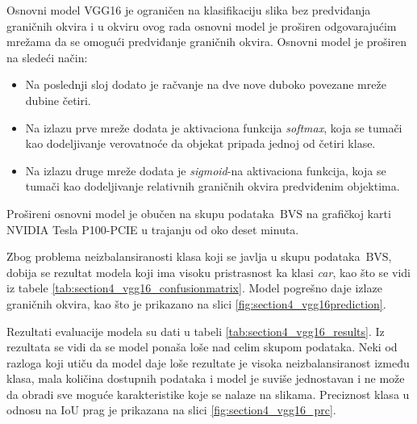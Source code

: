 \documentclass[12pt,oneside]{memoir}
\newcommand{\bvs}{\ensuremath{\,\textrm{BVS}}}
\begin{document}
Osnovni model VGG16 je ograničen na klasifikaciju slika bez predviđanja graničnih okvira i u okviru ovog rada osnovni model je proširen odgovarajućim mrežama da se omogući predviđanje graničnih okvira. Osnovni model je proširen na sledeći način:
\begin{itemize}
\item Na poslednji sloj dodato je račvanje na dve nove duboko povezane mreže dubine četiri.
\item Na izlazu prve mreže dodata je aktivaciona funkcija \textit{softmax}, koja se tumači kao dodeljivanje verovatnoće da objekat pripada jednoj od četiri klase.
\item Na izlazu druge mreže dodata je \textit{sigmoid}-na aktivaciona funkcija, koja se tumači kao dodeljivanje relativnih graničnih okvira predviđenim objektima.
\end{itemize}
Prošireni osnovni model je obučen na skupu podataka \bvs{} na grafičkoj karti NVIDIA Tesla P100-PCIE u trajanju od oko deset minuta.

Zbog problema neizbalansiranosti klasa koji se javlja u skupu podataka \bvs{}, dobija se rezultat modela koji ima visoku pristrasnost ka klasi \textit{car}, kao što se vidi iz tabele \ref{tab:section4_vgg16_confusionmatrix}. Model pogrešno daje izlaze graničnih okvira, kao što je prikazano na slici \ref{fig:section4_vgg16prediction}.

Rezultati evaluacije modela su dati u tabeli \ref{tab:section4_vgg16_results}. Iz rezultata se vidi da se model ponaša loše nad celim skupom podataka. Neki od razloga koji utiču da model daje loše rezultate je visoka neizbalansiranost između klasa, mala količina dostupnih podataka i model je suviše jednostavan i ne može da obradi sve moguće karakteristike koje se nalaze na slikama. Preciznost klasa u odnosu na IoU prag je prikazana na slici \ref{fig:section4_vgg16_prc}.
\end{document}
